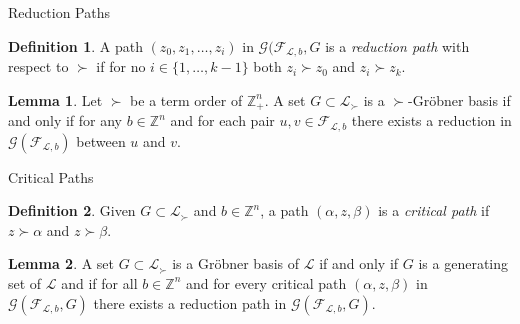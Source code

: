 \documentclass[9pt]{beamer}
\newcommand\F{\mathcal{F}}
\newcommand\G{\mathcal{G}}
\newcommand\Graph{\G(\F_{\mathcal{L}, b}, G)}
\newcommand\set[1]{\{#1\}}
\newcommand\Z{\mathbb{Z}}
\theoremstyle{definition}
\newtheorem{lem}{Lemma}
\newtheorem{defn}{Definition}
\begin{document}
\begin{frame}[fragile]{Reduction Paths}
  \begin{defn}
    A path $(z_0, z_1, \dots, z_i)$ in $\mathcal{G}(\mathcal{F}_{\mathcal{L}, b}, G$ is
    a \emph{reduction path} with respect to $\succ$ if for no $i \in \set{1, \dots, k-1}$
    both $z_i \succ z_0$ and $ z_i \succ z_k$.
  \end{defn}

  \begin{lem}
    Let $\succ$ be a term order of $\Z^n_+$. A set $G \subset \mathcal{L}_{\succ}$
    is a $\succ$-Gr\"obner basis if and only if for any $b \in \Z^n$ and for
    each pair $u, v \in \mathcal{F}_{\mathcal{L}, b}$ there exists a reduction in
    $\mathcal{G}(\mathcal{F}_{\mathcal{L}, b})$ between $u$ and $v$.
  \end{lem}
\end{frame}

\begin{frame}[fragile]{Critical Paths}
  \begin{defn}
    Given $G \subset \mathcal{L}_{\succ}$ and $b \in  \Z^n$, a path  $(\alpha, z, \beta)$
    is a \emph{critical path} if $z \succ \alpha$ and $z \succ\beta$.
  \end{defn}
  \begin{lem}
    A set $G \subset \mathcal{L}_{\succ}$ is a Gr\"obner basis of $\mathcal{L}$ if and only if $G$
    is a generating set of $\mathcal{L}$ and if for all $b  \in \Z^n$ and for every critical
    path $(\alpha, z, \beta)$ in $\Graph$ there exists a reduction path in $\Graph$.
  \end{lem}
\end{frame}
\end{document}
